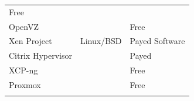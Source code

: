 \documentclass[
  14pt,
  english,
  a4paper,
]{scrreprt}
\begin{document}
\begin{longtable}[]{@{}lll@{}}
\begin{minipage}[t]{0.22\columnwidth}
Free\strut
\end{minipage}\tabularnewline
\begin{minipage}[t]{0.25\columnwidth}\raggedright
OpenVZ\strut
\end{minipage} & \begin{minipage}[t]{0.30\columnwidth}\raggedright
\strut
\end{minipage} & \begin{minipage}[t]{0.22\columnwidth}\raggedright
Free\strut
\end{minipage}\tabularnewline
\begin{minipage}[t]{0.25\columnwidth}\raggedright
Xen Project\strut
\end{minipage} & \begin{minipage}[t]{0.30\columnwidth}\raggedright
Linux/BSD\strut
\end{minipage} & \begin{minipage}[t]{0.22\columnwidth}\raggedright
Payed Software\strut
\end{minipage}\tabularnewline
\begin{minipage}[t]{0.25\columnwidth}\raggedright
Citrix Hypervisor\strut
\end{minipage} & \begin{minipage}[t]{0.30\columnwidth}\raggedright
\strut
\end{minipage} & \begin{minipage}[t]{0.22\columnwidth}\raggedright
Payed\strut
\end{minipage}\tabularnewline
\begin{minipage}[t]{0.25\columnwidth}\raggedright
XCP-ng\strut
\end{minipage} & \begin{minipage}[t]{0.30\columnwidth}\raggedright
\strut
\end{minipage} & \begin{minipage}[t]{0.22\columnwidth}\raggedright
Free\strut
\end{minipage}\tabularnewline
\begin{minipage}[t]{0.25\columnwidth}\raggedright
Proxmox\strut
\end{minipage} & \begin{minipage}[t]{0.30\columnwidth}\raggedright
\strut
\end{minipage} & \begin{minipage}[t]{0.22\columnwidth}\raggedright
Free\strut
\end{minipage}\tabularnewline
\begin{minipage}[t]{0.25\columnwidth}\raggedright

\end{minipage}
\end{longtable}
\end{document}
